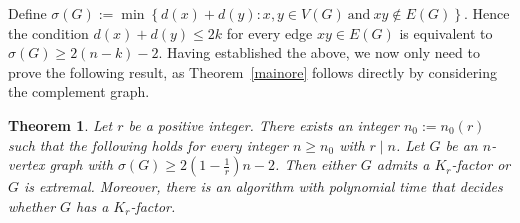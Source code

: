 \documentclass[11pt, a4paper]{article}
\newtheorem{theorem}{Theorem}[section]
\theoremstyle{definition}
\newcommand{\<}{\subseteq}
\begin{document}
Define $\sigma(G):=\min \left\{d(x)+d(y): x,y\in V(G) \ \text{and} \ xy\notin E(G)\right\}$. Hence the condition  $d(x)+d(y)\leq 2k$ for every edge $xy\in E(G)$ is equivalent to $\sigma(G)\geq 2(n-k)-2$. Having established the above, we now only need to prove the following result, as Theorem~\ref{mainore}  follows directly by considering the complement graph. %
\begin{theorem}\label{FVersion}
    Let $r$ be a positive integer. There exists an integer $n_0:=n_0(r)$ such that the following holds for every integer $n\geq n_0$ with $r\mid n$. Let $G$ be an $n$-vertex graph with $\sigma(G)\geq 2(1-\frac{1}{r})n-2$. Then either $G$ admits a $K_r$-factor or $G$ is extremal. Moreover, there
is an algorithm with polynomial time 
that decides whether $G$ has a $K_r$-factor. 
\end{theorem}








\end{document}
